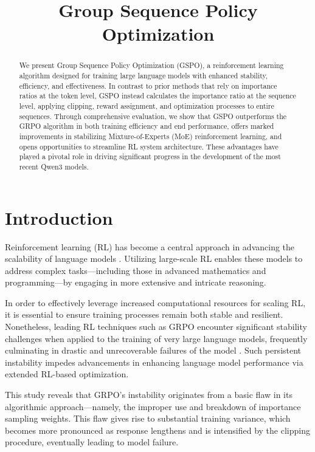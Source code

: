 \title{Group Sequence Policy Optimization}

\begin{abstract}
We present Group Sequence Policy Optimization (GSPO), a reinforcement learning algorithm designed for training large language models with enhanced stability, efficiency, and effectiveness. In contrast to prior methods that rely on importance ratios at the token level, GSPO instead calculates the importance ratio at the sequence level, applying clipping, reward assignment, and optimization processes to entire sequences. Through comprehensive evaluation, we show that GSPO outperforms the GRPO algorithm in both training efficiency and end performance, offers marked improvements in stabilizing Mixture-of-Experts (MoE) reinforcement learning, and opens opportunities to streamline RL system architecture. These advantages have played a pivotal role in driving significant progress in the development of the most recent Qwen3 models.
\end{abstract}

\section{Introduction}
\label{sec:intro}

Reinforcement learning (RL) has become a central approach in advancing the scalability of language models \citep{o1,dpsk-r1,qwq32b,qwen3}. Utilizing large-scale RL enables these models to address complex tasks—including those in advanced mathematics and programming—by engaging in more extensive and intricate reasoning.

In order to effectively leverage increased computational resources for scaling RL, it is essential to ensure training processes remain both stable and resilient. Nonetheless, leading RL techniques such as GRPO \citep{grpo} encounter significant stability challenges when applied to the training of very large language models, frequently culminating in drastic and unrecoverable failures of the model \citep{qwen3, minimax-m1}. Such persistent instability impedes advancements in enhancing language model performance via extended RL-based optimization.

This study reveals that GRPO's instability originates from a basic flaw in its algorithmic approach—namely, the improper use and breakdown of importance sampling weights. This flaw gives rise to substantial training variance, which becomes more pronounced as response lengthens and is intensified by the clipping procedure, eventually leading to model failure.

